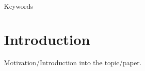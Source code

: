
Keywords

\section{Introduction}
\label{cha:Introduction}
Motivation/Introduction into the topic/paper.


%
%
%
%
%
%
%

